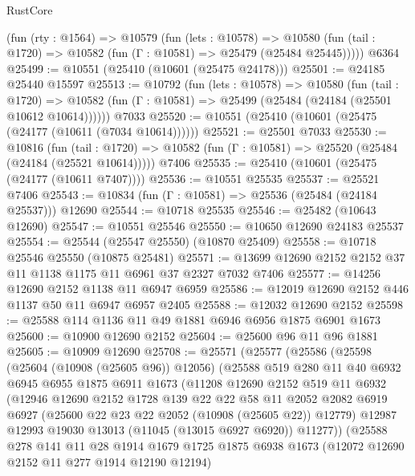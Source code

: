 \begin{lexlean}{RustCore}
\begin{coremodule}
    (fun (rty : @1564) =>
    @10579
      (fun (lets : @10578) =>
      @10580 (fun (tail : @1720) => @10582 (fun (Γ : @10581) => @25479 (@25484 @25445)))))
    @6364
@25499 := @10551 (@25410 (@10601 (@25475 @24178)))
@25501 := @24185 @25440 @15597
@25513 := @10792
    (fun (lets : @10578) =>
    @10580
      (fun (tail : @1720) =>
      @10582 (fun (Γ : @10581) => @25499 (@25484 (@24184 (@25501 @10612 @10614))))))
    @7033
@25520 := @10551 (@25410 (@10601 (@25475 (@24177 (@10611 (@7034 @10614))))))
@25521 := @25501 @7033
@25530 := @10816
    (fun (tail : @1720) => @10582 (fun (Γ : @10581) => @25520 (@25484 (@24184 (@25521 @10614)))))
    @7406
@25535 := @25410 (@10601 (@25475 (@24177 (@10611 @7407))))
@25536 := @10551 @25535
@25537 := @25521 @7406
@25543 := @10834 (fun (Γ : @10581) => @25536 (@25484 (@24184 @25537))) @12690
@25544 := @10718 @25535
@25546 := @25482 (@10643 @12690)
@25547 := @10551 @25546
@25550 := @10650 @12690 @24183 @25537
@25554 := @25544 (@25547 @25550) (@10870 @25409)
@25558 := @10718 @25546 @25550 (@10875 @25481)
@25571 := @13699 @12690 @2152 @2152 @37 @11 @1138 @1175 @11 @6961 @37 @2327 @7032 @7406
@25577 := @14256 @12690 @2152 @1138 @11 @6947 @6959
@25586 := @12019 @12690 @2152 @446 @1137 @50 @11 @6947 @6957 @2405
@25588 := @12032 @12690 @2152
@25598 := @25588 @114 @1136 @11 @49 @1881 @6946 @6956 @1875 @6901 @1673
@25600 := @10900 @12690 @2152
@25604 := @25600 @96 @11 @96 @1881
@25605 := @10909 @12690
@25708 := @25571
    (@25577
      (@25586
        (@25598
          (@25604 (@10908 (@25605 @96)) @12056)
          (@25588
            @519
            @280
            @11
            @40
            @6932
            @6945
            @6955
            @1875
            @6911
            @1673
            (@11208
              @12690
              @2152
              @519
              @11
              @6932
              (@12946
                @12690
                @2152
                @1728
                @139
                @22
                @22
                @58
                @11
                @2052
                @2082
                @6919
                @6927
                (@25600 @22 @23 @22 @2052 (@10908 (@25605 @22)) @12779)
                @12987
                @12993
                @19030
                @13013
                (@11045 (@13015 @6927 @6920))
                @11277))
            (@25588
              @278
              @141
              @11
              @28
              @1914
              @1679
              @1725
              @1875
              @6938
              @1673
              (@12072 @12690 @2152 @11 @277 @1914 @12190 @12194)

\end{coremodule}
\end{lexlean}
